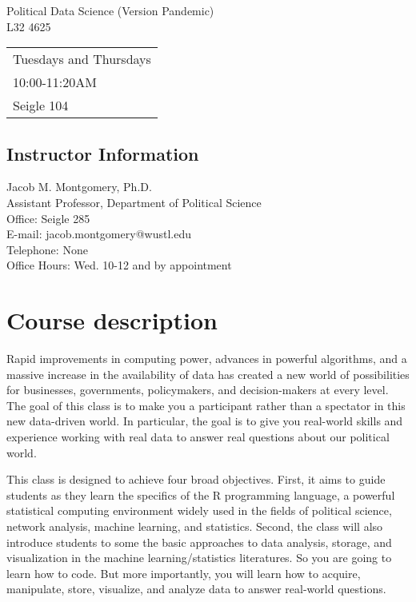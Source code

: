 \documentclass[11pt]{article}
\begin{document}
\pagestyle{plain} 

\begin{center}

\vspace{5pt}
\Large{Political Data Science (Version Pandemic) }\\
\Large{L32 4625}
\vspace{4 mm}

\small


\vspace{4 mm}

     \begin{tabular}{l }
       Tuesdays and Thursdays\\
      10:00-11:20AM \\
      Seigle 104
       \end{tabular}
\end{center}

\subsection*{Instructor Information}

\noindent Jacob M. Montgomery, Ph.D.\\
\noindent Assistant Professor, Department of Political Science\\
Office: Seigle 285\\
E-mail: jacob.montgomery@wustl.edu\\
Telephone: None \\
Office Hours: Wed. 10-12 and by appointment 

\section*{Course description}


Rapid improvements in computing power, advances in powerful
algorithms, and a massive increase in the availability of data has
created a new world of possibilities for businesses, governments,
policymakers, and decision-makers at every level. The goal of this
class is to make you a participant rather than a spectator in this new
data-driven world.  In particular, the goal is to give you real-world
skills and experience working with real data to answer real questions
about our political world.

This class is designed to achieve four broad objectives. First, it
aims to guide students as they learn the specifics of the R
programming language, a powerful statistical computing environment
widely used in the fields of political science, network analysis,
machine learning, and statistics.  Second, the class will also
introduce students to some the basic approaches to data analysis,
storage, and visualization in the machine learning/statistics
literatures.  So you are going to learn how to code. But more
importantly, you will learn how to acquire, manipulate, store,
visualize, and analyze data to answer real-world questions.
\end{document}
